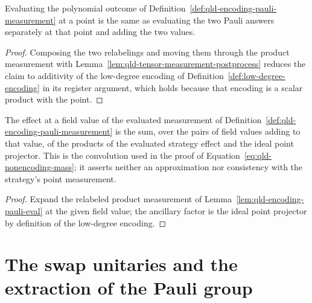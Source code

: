 	\begin{lemma}
		\label{lem:qld-encoding-pauli-eval}
		\leanok
		Evaluating the polynomial outcome of
		Definition~\ref{def:qld-encoding-pauli-measurement} at a point is the same
		as evaluating the two Pauli answers separately at that point and adding the
		two values.
	\end{lemma}
	\begin{proof}
		\leanok
		Composing the two relabelings and moving them through the product
		measurement with Lemma~\ref{lem:qld-tensor-measurement-postprocess} reduces
		the claim to additivity of the low-degree encoding of
		Definition~\ref{def:low-degree-encoding} in its register argument, which
		holds because that encoding is a scalar product with the point.
	\end{proof}

	\begin{lemma}
		\label{lem:qld-encoding-pauli-convolution}
		\leanok
		The effect at a field value of the evaluated measurement of
		Definition~\ref{def:qld-encoding-pauli-measurement} is the sum, over the
		pairs of field values adding to that value, of the products of the
		evaluated strategy effect and the ideal point projector. This is the
		convolution used in the proof of
		Equation~\eqref{eq:qld-nonencoding-mass}; it asserts neither an
		approximation nor consistency with the strategy's point measurement.
	\end{lemma}
	\begin{proof}
		\leanok
		Expand the relabeled product measurement of
		Lemma~\ref{lem:qld-encoding-pauli-eval} at the given field value; the
		ancillary factor is the ideal point projector by definition of the
		low-degree encoding.
	\end{proof}

\section{The swap unitaries and the extraction of the Pauli group}

